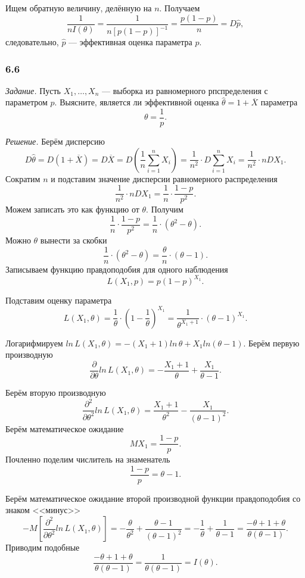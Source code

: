 Ищем обратную величину, делённую на $n$.
Получаем
$$ \frac{1}{nI \left( \theta \right) } =
  \frac{1}{n \left[ p \left( 1 - p \right) \right]^{-1}} =
  \frac{p \left( 1 - p \right) }{n} =
  D \hat{p},$$
следовательно, $ \hat{p}$ --- эффективная оценка параметра $p$.

\subsubsection*{6.6}

\textit{Задание.}
Пусть $X_1, \dotsc, X_n$ --- выборка из равномерного рпспределения с параметром $p$.
Выясните, является ли эффективной оценка $ \hat{ \theta } = 1 + \overline{X}$ параметра
$$ \theta =
  \frac{1}{p}.$$

\textit{Решение.} Берём дисперсию
$$D \hat{ \theta } =
  D \left( 1 + \overline{X} \right) =
  D \overline{X} =
  D \left( \frac{1}{n} \sum \limits_{i = 1}^n X_i \right) =
  \frac{1}{n^2} \cdot D \sum \limits_{i = 1}^n X_i =
  \frac{1}{n^2} \cdot nDX_1.$$
Сократим $n$ и подставим значение дисперсии равномерного распределения
$$ \frac{1}{n^2} \cdot nDX_1 =
  \frac{1}{n} \cdot \frac{1 - p}{p^2}.$$
Можем записать это как функцию от $ \theta $.
Получим
$$ \frac{1}{n} \cdot \frac{1 - p}{p^2} =
  \frac{1}{n} \cdot \left( \theta^2 - \theta \right).$$
Можно $ \theta $ вынести за скобки
$$ \frac{1}{n} \cdot \left( \theta^2 - \theta \right) =
  \frac{ \theta }{n} \cdot \left( \theta - 1 \right).$$
Записываем функцию правдоподобия для одного наблюдения
$$L \left( X_1, p \right) =
  p \left( 1 - p \right)^{X_1}.$$

Подставим оценку параметра
$$L \left( X_1, \theta \right) =
  \frac{1}{ \theta } \cdot \left( 1 - \frac{1}{ \theta } \right)^{X_1} =
  \frac{1}{ \theta^{X_1 + 1}} \cdot \left( \theta - 1 \right)^{X_1}.$$

Логарифмируем
$ln \, L \left( X_1, \theta \right) =
  - \left( X_1 + 1 \right) ln \, \theta + X_1 ln \left( \theta - 1 \right) $.
Берём первую производную
$$ \frac{ \partial }{ \partial \theta } ln \, L \left( X_1, \theta \right) =
  - \frac{X_1 + 1}{ \theta } + \frac{X_1}{ \theta - 1}.$$

Берём вторую производную
$$ \frac{ \partial^2}{ \partial \theta^2} ln \, L \left( X_1, \theta \right)  =
  \frac{X_1 + 1}{ \theta^2} - \frac{X_1}{ \left( \theta - 1 \right)^2}.$$
Берём математическое ожидание
$$MX_1 =
  \frac{1 - p}{p}.$$
Почленно поделим числитель на знаменатель
$$ \frac{1 - p}{p} =
  \theta - 1.$$

Берём математическое ожидание второй производной функции правдоподобия со знаком <<минус>>
$$-M \left[ \frac{ \partial^2}{ \partial \theta^2} ln \, L \left( X_1, \theta \right) \right] =
  - \frac{ \theta }{ \theta^2} + \frac{ \theta - 1}{ \left( \theta - 1 \right)^2} =
  - \frac{1}{ \theta } + \frac{1}{ \theta - 1} =
  \frac{- \theta + 1 + \theta }{ \theta \left( \theta - 1 \right) }.$$
Приводим подобные
$$ \frac{- \theta + 1 + \theta }{ \theta \left( \theta - 1 \right) } =
  \frac{1}{ \theta \left( \theta - 1 \right) } =
  I \left( \theta \right).$$

